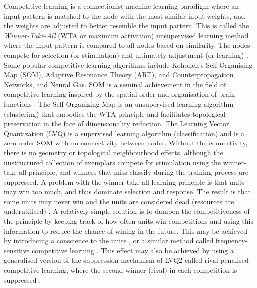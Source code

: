 Competitive learning is a connectionist machine-learning paradigm where an input pattern is matched to the node with the most similar input weights, and the weights are adjusted to better resemble the input pattern. This is called the \emph{Winner-Take-All} (WTA or maximum activation) unsupervised learning method where the input pattern is compared to all nodes based on similarity. The nodes compete for selection (or stimulation) and ultimately adjustment (or learning) \cite{Luger1997}. Some popular competitive learning algorithms include Kohonen's Self-Organising Map (SOM), Adaptive Resonance Theory (ART), and Counterpropagation Networks, and Neural Gas. SOM is a seminal achievement in the field of competitive learning inspired by the spatial order and organisation of brain functions \cite{Kohonen2001}. The Self-Organizing Map is an unsupervised learning algorithm (clustering) that embodies the WTA principle and facilitates topological preservation in the face of dimensionality reduction. The Learning Vector Quantization (LVQ) is a supervised learning algorithm (classification) and is a zero-order SOM with no connectivity between nodes. Without the connectivity, there is no geometry or topological neighbourhood effects, although the unstructured collection of exemplars compete for stimulation using the winner-take-all principle, and winners that miss-classify during the training process are suppressed. A problem with the winner-take-all learning principle is that units may win too much, and thus dominate selection and response. The result is that some units may never win and the units are considered dead (resources are underutilised) \cite{Rumelhart1985}. A relatively simple solution is to dampen the competitiveness of the principle by keeping track of how often units win competitions and using this information to reduce the chance of wining in the future. This may be achieved by introducing a conscience to the units \cite{DeSieno1988}, or a similar method called frequency-sensitive competitive learning \cite{Ahalt1990}. This effect may also be achieved by using a generalised version of the suppression mechanism of LVQ2 called rival-penalised competitive learning, where the second winner (rival) in each competition is suppressed \cite{Xu1993}.

